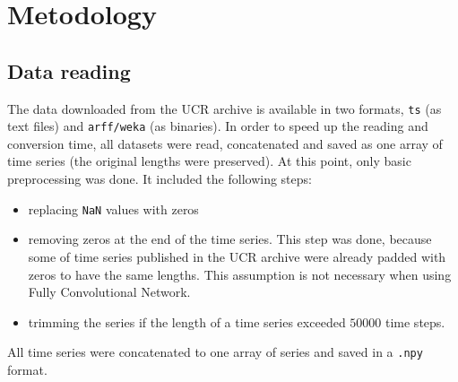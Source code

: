 \documentclass[a4paper,11pt,twoside]{report}
\theoremstyle{definition}
\begin{document}
\chapter{Metodology}
\section{Data reading}
The data downloaded from the UCR archive is available in two formats, \texttt{ts} (as text files) and \texttt{arff/weka} (as binaries). In order to speed up the reading and conversion time, all datasets were read, concatenated and saved as one array of time series (the original lengths were preserved). At this point, only basic preprocessing was done. It included the following steps:
\begin{itemize}
\item replacing \texttt{NaN} values with zeros
\item removing zeros at the end of the time series. This step was done, because some of time series published in the UCR archive were already padded with zeros to have the same lengths. This assumption is not necessary when using Fully Convolutional Network.
\item trimming the series if the length of a time series exceeded $50 000$ time steps.


\end{itemize}

All time series were concatenated to one array of series and saved in a \texttt{.npy} format.
\end{document}
